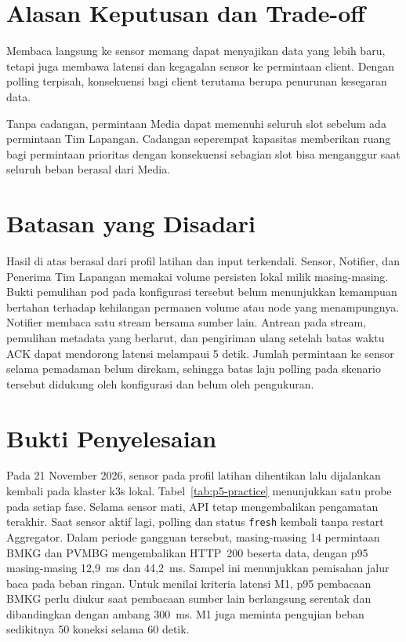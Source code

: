 \section{Alasan Keputusan dan Trade-off}

Membaca langsung ke sensor memang dapat menyajikan data yang lebih baru, tetapi juga membawa latensi dan kegagalan sensor ke permintaan client. Dengan polling terpisah, konsekuensi bagi client terutama berupa penurunan kesegaran data.

Tanpa cadangan, permintaan Media dapat memenuhi seluruh slot sebelum ada permintaan Tim Lapangan. Cadangan seperempat kapasitas memberikan ruang bagi permintaan prioritas dengan konsekuensi sebagian slot bisa menganggur saat seluruh beban berasal dari Media.

\section{Batasan yang Disadari}

Hasil di atas berasal dari profil latihan dan input terkendali. Sensor, Notifier, dan Penerima Tim Lapangan memakai volume persisten lokal milik masing-masing. Bukti pemulihan pod pada konfigurasi tersebut belum menunjukkan kemampuan bertahan terhadap kehilangan permanen volume atau node yang menampungnya. Notifier membaca satu stream bersama sumber lain. Antrean pada stream, pemulihan metadata yang berlarut, dan pengiriman ulang setelah batas waktu ACK dapat mendorong latensi melampaui 5 detik. Jumlah permintaan ke sensor selama pemadaman belum direkam, sehingga batas laju polling pada skenario tersebut didukung oleh konfigurasi dan belum oleh pengukuran.

\section{Bukti Penyelesaian}

Pada 21 November 2026, sensor pada profil latihan dihentikan lalu dijalankan kembali pada klaster k3s lokal. Tabel~\ref{tab:p5-practice} menunjukkan satu probe pada setiap fase. Selama sensor mati, API tetap mengembalikan pengamatan terakhir. Saat sensor aktif lagi, polling dan status \texttt{fresh} kembali tanpa restart Aggregator. Dalam periode gangguan tersebut, masing-masing 14 permintaan BMKG dan PVMBG mengembalikan HTTP~200 beserta data, dengan p95 masing-masing 12,9~ms dan 44,2~ms. Sampel ini menunjukkan pemisahan jalur baca pada beban ringan. Untuk menilai kriteria latensi M1, p95 pembacaan BMKG perlu diukur saat pembacaan sumber lain berlangsung serentak dan dibandingkan dengan ambang 300~ms. M1 juga meminta pengujian beban sedikitnya 50 koneksi selama 60 detik.

